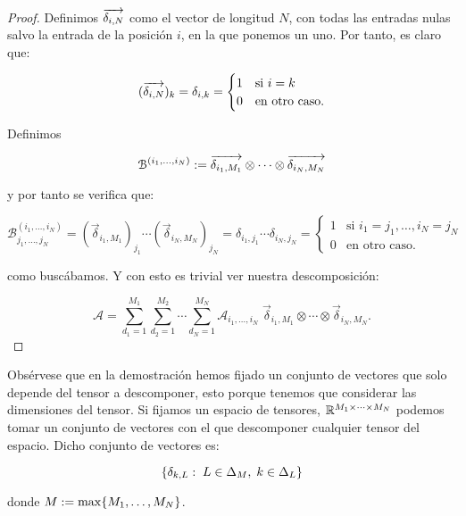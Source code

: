 \begin{proof}
	Definimos $\overrightarrow{\delta_{i, N}}$ como el vector de longitud $N$, con todas las entradas nulas salvo la entrada de la posición $i$, en la que ponemos un uno. Por tanto, es claro que:

	\begin{equation}
		(\overrightarrow{\delta_{i, N}})_k =  \delta_{i, k} =
		\begin{cases}
			1 & \text{si } i = k    \\
			0 & \text{en otro caso}.
		\end{cases}
	\end{equation}

	Definimos

	\begin{equation}
		\mathcal{B}^{(i_1, \ldots, i_N)} := \overrightarrow{\delta_{i_1, M_1}} \otimes \cdots \otimes \overrightarrow{\delta_{i_N, M_N}}
	\end{equation}

	y por tanto se verifica que:

	\begin{equation}
		\mathcal{B}^{(i_1, \ldots, i_N)}_{j_1, \ldots, j_N} = (\vec{\delta}_{i_1, M_1})_{j_1} \cdots (\vec{\delta}_{i_N, M_N})_{j_N} = \delta_{i_1, j_1} \cdots \delta_{i_N, j_N} =
		\begin{cases}
			1 & \text{si } i_1 = j_1, \ldots, i_N = j_N \\
			0 & \text{en otro caso}.
		\end{cases}
	\end{equation}

	como buscábamos. Y con esto es trivial ver nuestra descomposición:

	\begin{equation}
		\mathcal{A} = \sum_{d_1 = 1}^{M_1} \sum_{d_2 = 1}^{M_2} \cdots \sum_{d_N = 1}^{M_N} \mathcal{A}_{i_1, \ldots, i_N} \; \vec{\delta}_{i_1, M_1} \otimes \cdots \otimes \vec{\delta}_{i_N, M_N}.
	\end{equation}
\end{proof}

\begin{observacion} \label{observacion:descomposicion_cp_conjunta}

	Obsérvese que en la demostración hemos fijado un conjunto de vectores que solo depende del tensor a descomponer, esto porque tenemos que considerar las dimensiones del tensor. Si fijamos un espacio de tensores, $\mathbb{R}^{M_1 \times \cdots \times M_N}$ podemos tomar un conjunto de vectores con el que descomponer cualquier tensor del espacio. Dicho conjunto de vectores es:

	\begin{equation}
		\{ \delta_{k, L}: \; L \in \Delta_{M}, \; k \in \Delta_{L} \}
	\end{equation}

	donde $M := \max \{ M_1, \ldots, M_N \}$.

\end{observacion}

